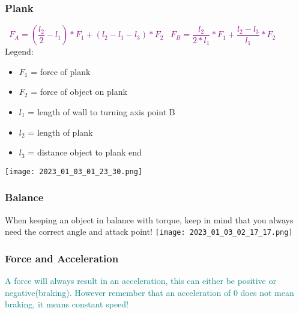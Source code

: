 \documentclass[main.tex,fontsize=8pt,paper=a4,paper=portrait,DIV=calc,]{scrartcl}
\begin{document}
\begin{multicols*}{2}
\subsubsection{Plank}
\, \newline
\large \textcolor{purple}{\( F_A =\left(\dfrac{l_2}{2}-l_1\right) * F_1 + \left( l_2-l_1-l_3 \right) * F_2\)}\newline
\, \newline
\large \textcolor{purple}{\( F_B = \dfrac{l_2}{2*l_1} * F_1 + \dfrac{l_2 - l_3}{l_1} * F_2 \)}
\, \newline
\normalsize Legend: \newline
\begin{itemize}
\item \(F_1\) = force of plank
\item \(F_2\) = force of object on plank
\item \(l_1\) = length of wall to turning axis point B 
\item \(l_2\) = length of plank
\item \(l_3\) = distance object to plank end 
\end{itemize} 
\texttt{[image: 2023\_01\_03\_01\_23\_30.png]}

\subsubsection{Balance}
When keeping an object in balance with torque, keep in mind that you always need the correct angle and attack point!\newline
\texttt{[image: 2023\_01\_03\_02\_17\_17.png]}

\subsubsection{Force and Acceleration} 
\textcolor{teal}{A force will always result in an acceleration, this can either be positive or negative(braking).\newline
However remember that an acceleration of 0 does not mean braking, it means constant speed!}


\end{multicols*}
\end{document}

